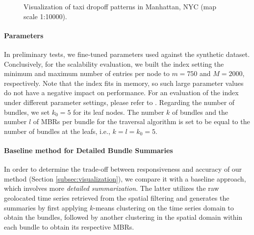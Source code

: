 \begin{figure}[ht]
 \centering
 \caption{Visualization of taxi dropoff patterns in Manhattan, NYC (map scale 1:10000).}
 \vspace{-7.5pt}
 \label{fig:nyc_example}
\end{figure}

\label{subsubsec:bundle_sum_benchmarking}

\paragraph{Parameters} In preliminary tests, we fine-tuned parameters used against the synthetic dataset. Conclusively, for the scalability evaluation, we built the \btsr index setting the minimum and maximum number of entries per node to $m=750$ and $M=2000$, respectively. Note that the index fits in memory, so such large parameter values do not have a negative impact on performance. For an evaluation of the \btsr index under different parameter settings, please refer to \cite{chatzig17btsr}. Regarding the number of bundles, we set $k_0 = 5$ for its leaf nodes. The number $k$ of bundles and the number $l$ of MBRs per bundle for the traversal algorithm is set to be equal to the number of bundles at the leafs, i.e., $k = l = k_0 = 5$.

\paragraph{Baseline method for Detailed Bundle Summaries} In order to determine the trade-off between responsiveness and accuracy of our method (Section \ref{subsec:visualization}), we compare it with a baseline approach, which involves more {\em detailed summarization}. The latter utilizes the raw geolocated time series retrieved from the spatial filtering and generates the summaries by first applying $k$-means clustering on the time series domain to obtain the bundles, followed by another clustering in the spatial domain within each bundle to obtain its respective MBRs. 

